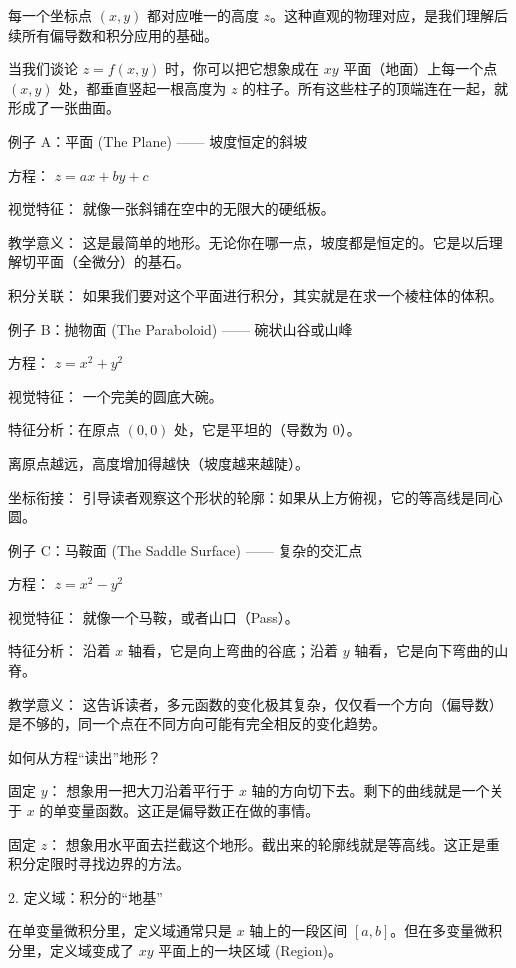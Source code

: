 每一个坐标点 $(x, y)$ 都对应唯一的高度 $z$。这种直观的物理对应，是我们理解后续所有偏导数和积分应用的基础。

当我们谈论 $z = f(x, y)$ 时，你可以把它想象成在 $xy$ 平面（地面）上每一个点 $(x, y)$ 处，都垂直竖起一根高度为 $z$ 的柱子。所有这些柱子的顶端连在一起，就形成了一张曲面。

例子 A：平面 (The Plane) —— 坡度恒定的斜坡

方程： $z = ax + by + c$

视觉特征： 就像一张斜铺在空中的无限大的硬纸板。

教学意义： 这是最简单的地形。无论你在哪一点，坡度都是恒定的。它是以后理解切平面（全微分）的基石。

积分关联： 如果我们要对这个平面进行积分，其实就是在求一个棱柱体的体积。

例子 B：抛物面 (The Paraboloid) —— 碗状山谷或山峰

方程： $z = x^2 + y^2$

视觉特征： 一个完美的圆底大碗。

特征分析：在原点 $(0, 0)$ 处，它是平坦的（导数为 0）。

离原点越远，高度增加得越快（坡度越来越陡）。

坐标衔接： 引导读者观察这个形状的轮廓：如果从上方俯视，它的等高线是同心圆。

例子 C：马鞍面 (The Saddle Surface) —— 复杂的交汇点

方程： $z = x^2 - y^2$

视觉特征： 就像一个马鞍，或者山口（Pass）。

特征分析： 沿着 $x$ 轴看，它是向上弯曲的谷底；沿着 $y$ 轴看，它是向下弯曲的山脊。

教学意义： 这告诉读者，多元函数的变化极其复杂，仅仅看一个方向（偏导数）是不够的，同一个点在不同方向可能有完全相反的变化趋势。

如何从方程“读出”地形？

固定 $y$： 想象用一把大刀沿着平行于 $x$ 轴的方向切下去。剩下的曲线就是一个关于 $x$ 的单变量函数。这正是偏导数正在做的事情。

固定 $z$： 想象用水平面去拦截这个地形。截出来的轮廓线就是等高线。这正是重积分定限时寻找边界的方法。







2. 定义域：积分的“地基”

在单变量微积分里，定义域通常只是 $x$ 轴上的一段区间 $[a, b]$。但在多变量微积分里，定义域变成了 $xy$ 平面上的一块区域 (Region)。

